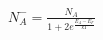 \documentclass[a4paper,12pt]{article}
\begin{document}
\huge

$N_A^- = \frac{N_A}{1+2e^\frac{E_A-E_F}{kT}}$
\end{document}
